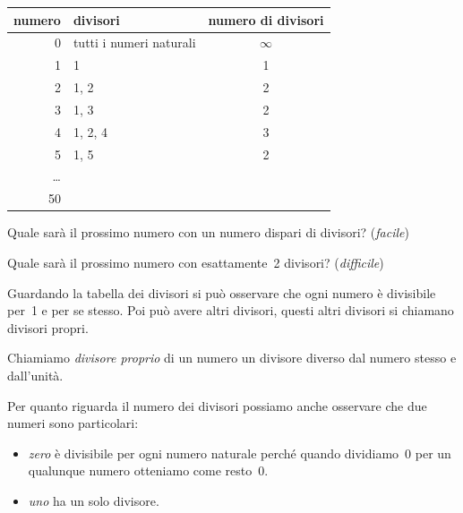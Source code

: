 \begin{table}[h]
\centering
\begin{tabular}{|r|p{6cm}|c|}
\hline
\textsf{\relax 
numero
} & \textsf{\relax 
          divisori          
} & \textsf{\relax 
numero di divisori
}\\
\hline
0 & tutti i numeri naturali & \(\infty\)\\
\hline
1 & 1 & 1\\
\hline
2 & 1, 2 & 2\\
\hline
3 & 1, 3 & 2\\
\hline
4 & 1, 2, 4 & 3\\
\hline
5 & 1, 5 & 2\\
\hline
\dots &  & \\
\hline
50 &  & \\
\hline
\end{tabular}
\end{table}

\begin{enumeratea}
 \item Quale sarà il prossimo numero con un numero dispari 
  di divisori? (\emph{facile})
 \item Quale sarà il prossimo numero con esattamente~2
  divisori? (\emph{difficile})
\end{enumeratea}

Guardando la tabella dei divisori si può osservare che ogni numero è 
divisibile per~1 e per se stesso. Poi può avere altri divisori, questi
altri divisori si chiamano divisori propri.

\begin{definizione}
 Chiamiamo \emph{divisore proprio} di un numero un divisore diverso dal 
 numero stesso e dall'unità.
\end{definizione}

Per quanto riguarda il numero dei divisori possiamo anche osservare che 
due numeri sono particolari:

\begin{itemize} [nosep]
 \item \emph{zero} è divisibile per ogni numero naturale perché quando 
  dividiamo~0 per un qualunque numero otteniamo come resto~0.
 \item \emph{uno} ha un solo divisore.
\end{itemize}

